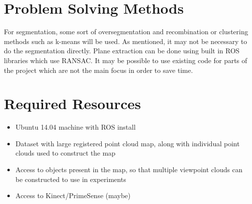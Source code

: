 \documentclass[10pt,a4paper]{article}
\begin{document}
\section{Problem Solving Methods}
For segmentation, some sort of oversegmentation and recombination or clustering
methods such as k-means will be used. As mentioned, it may not be necessary to
do the segmentation directly. Plane extraction can be done using built in ROS
libraries which use RANSAC. It may be possible to use existing code for parts of
the project which are not the main focus in order to save time.
\section{Required Resources}
\begin{itemize}
\item Ubuntu 14.04 machine with ROS install
\item Dataset with large registered point cloud map, along with individual
  point clouds used to construct the map
\item Access to objects present in the map, so that multiple viewpoint clouds
  can be constructed to use in experiments
\item Access to Kinect/PrimeSense (maybe)
\end{itemize}
\end{document}
